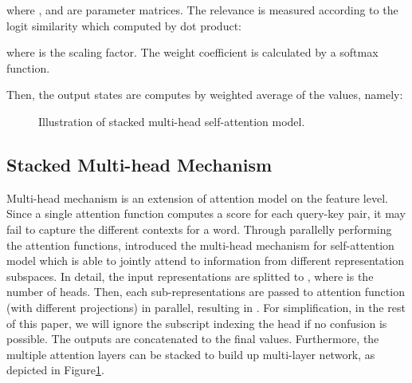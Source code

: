 \documentclass[11pt,a4paper]{article}
\begin{document}
where ,  and  are parameter matrices. The relevance is measured according to the logit similarity which computed by dot product:

where  is the scaling factor. The weight coefficient is calculated by a softmax function.

Then, the output states  are computes by weighted average of the values, namely: 

\begin{figure}[t]
    \centering
\caption{    
\label{fig:stacked}
Illustration of stacked multi-head self-attention model.
}
\end{figure}
\subsection{Stacked Multi-head Mechanism}

Multi-head mechanism is an extension of attention model on the feature level. Since a single attention function computes a score for each query-key pair, it may fail to capture the different contexts for a word. Through parallelly performing the attention functions,  introduced the multi-head mechanism for self-attention model which is able to jointly attend to information from different representation subspaces. In detail, the input representations  are splitted to , where  is the number of heads. Then, each sub-representations are passed to attention function (with different projections) in parallel, resulting in . For simplification, in the rest of this paper, we will ignore the subscript  indexing the head if no confusion is possible.  The outputs are concatenated to the final values. Furthermore, the multiple attention layers can be stacked to build up multi-layer network, as depicted in Figure\ref{fig:stacked}. 
\end{document}
